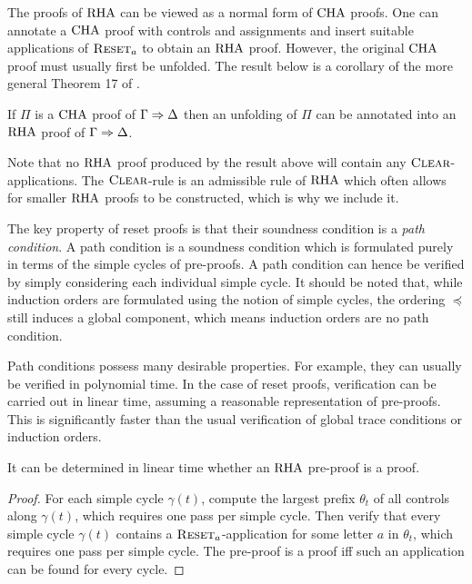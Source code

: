 The proofs of $\mathrm{RHA}$ can be viewed as a normal form of $\mathrm{CHA}$ proofs. 
One can annotate a $\mathrm{CHA}$ proof with controls and assignments and insert
suitable applications of $\textsc{Reset}_a$ to obtain an $\mathrm{RHA}$ proof. However, the
original $\mathrm{CHA}$ proof must usually first be unfolded. The result below is a
corollary of the more general Theorem 17 of \papOne{}.

\begin{fact}
  If $\Pi$ is a $\mathrm{CHA}$ proof of $\Gamma \Rightarrow \Delta$ then an unfolding of
  $\Pi$ can be annotated into an $\mathrm{RHA}$ proof of $\Gamma \Rightarrow \Delta$.
\end{fact}

Note that no $\mathrm{RHA}$ proof produced by the result above will contain any
$\textsc{Clear}$-applications. The $\textsc{Clear}$-rule is
an admissible rule of $\mathrm{RHA}$ which often allows for smaller $\mathrm{RHA}$
proofs to be constructed, which is why we include it.

The key property of reset proofs is that their soundness condition is a
\emph{path condition}. A path condition is a soundness condition which is
formulated purely in terms of the simple cycles of pre-proofs. A path condition
can hence be verified by simply considering each individual simple
cycle. It should be noted that, while induction orders are formulated using the
notion of simple cycles, the ordering $\preceq$ still induces a global component,
which means induction orders are no path condition.

Path conditions possess many desirable properties. For example, they can usually
be verified in polynomial time. In the case of reset proofs, verification can be carried
out in linear time, assuming a reasonable representation of pre-proofs. This is
significantly faster than the usual verification of global trace conditions or
induction orders.

\begin{proposition}
  It can be determined in linear time whether an $\mathrm{RHA}$ pre-proof is a proof.
\end{proposition}
\begin{proof}
  For each simple cycle $\gamma(t)$, compute the largest prefix $\theta_t$ of all
  controls along $\gamma(t)$, which requires one pass per simple cycle.
  Then verify that every simple cycle $\gamma(t)$ contains a
  $\textsc{Reset}_a$-application for some letter $a$ in $\theta_t$, which requires
  one pass per simple cycle. The pre-proof is a proof iff such an application can
  be found for every cycle.
\end{proof}

